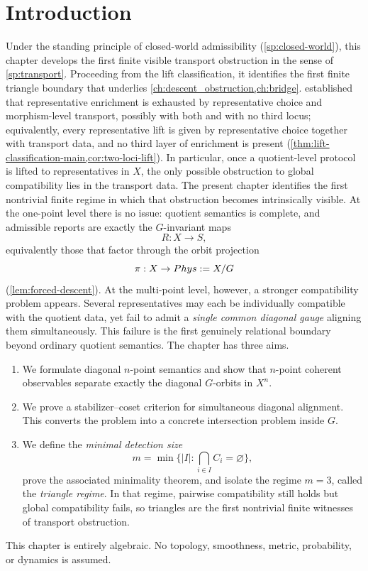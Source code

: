 \section{Introduction}
Under the standing principle of closed-world admissibility
(\cref{sp:closed-world}), this chapter develops the first finite visible
transport obstruction in the sense of \cref{sp:transport}.
Proceeding from the lift classification, it identifies the first finite
triangle boundary that underlies \cref{ch:descent_obstruction,ch:bridge}.
 established that representative enrichment is
exhausted by representative choice and morphism-level transport,
possibly with both and with no third locus; equivalently, every
representative lift is given by representative choice together with
transport data, and no third layer of enrichment is present
(\cref{thm:lift-classification-main,cor:two-loci-lift}).
In particular, once a quotient-level protocol is lifted to
representatives in \(X\), the only possible obstruction to global
compatibility lies in the transport data.
The present chapter identifies the first nontrivial finite regime in
which that obstruction becomes intrinsically visible.
At the one-point level there is no issue: quotient semantics is complete,
and admissible reports are exactly the \(G\)-invariant maps
\[
	R:X\to S,
\]
equivalently those that factor through the orbit projection
\[
	\pi:X\to Phys:=X/G
\]
(\cref{lem:forced-descent}).
At the multi-point level, however, a stronger compatibility problem
appears. Several representatives may each be individually compatible
with the quotient data, yet fail to admit a \emph{single common diagonal
	gauge} aligning them simultaneously.
This failure is the first genuinely relational boundary beyond ordinary
quotient semantics.
The chapter has three aims.
\begin{enumerate}
	\item We formulate diagonal \(n\)-point semantics and show that
	      \(n\)-point coherent observables separate exactly the diagonal
	      \(G\)-orbits in \(X^n\).
	\item We prove a stabilizer--coset criterion for simultaneous diagonal
	      alignment. This converts the problem into a concrete intersection
	      problem inside \(G\).
	\item We define the \emph{minimal detection size}
	      \[
		      m=\min\{|I|:\bigcap_{i\in I}C_i=\varnothing\},
	      \]
	      prove the associated minimality theorem, and isolate the regime \(m=3\),
	      called the \emph{triangle regime}. In that regime, pairwise compatibility
	      still holds but global compatibility fails, so triangles are the first
	      nontrivial finite witnesses of transport obstruction.
\end{enumerate}
This chapter is entirely algebraic. No topology, smoothness, metric,
probability, or dynamics is assumed.
